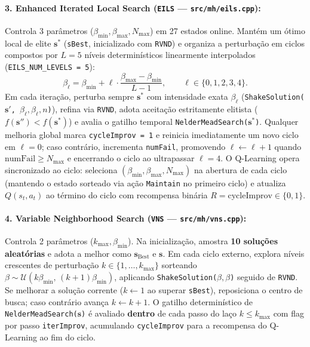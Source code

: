 \documentclass[11pt,a4paper]{article}
\begin{document}
\paragraph{3. Enhanced Iterated Local Search (\texttt{EILS} --- \texttt{src/mh/eils.cpp}):}
Controla 3 parâmetros ($\beta_{\min}, \beta_{\max}, N_{\max}$) em 27 estados online. Mantém um ótimo local de elite $\mathbf{s}^*$ (\texttt{sBest}, inicializado com \texttt{RVND}) e organiza a perturbação em ciclos compostos por $L = 5$ níveis determinísticos linearmente interpolados (\texttt{EILS\_NUM\_LEVELS = 5}):
\begin{equation}
  \beta_\ell = \beta_{\min} + \ell \cdot \frac{\beta_{\max} - \beta_{\min}}{L - 1},
  \qquad \ell \in \{0, 1, 2, 3, 4\}.
  \label{eq:eils_levels}
\end{equation}
Em cada iteração, perturba sempre $\mathbf{s}^*$ com intensidade exata $\beta_\ell$ (\texttt{ShakeSolution($\mathbf{s}'$, $\beta_\ell, \beta_\ell, n$)}), refina via \texttt{RVND}, adota aceitação estritamente elitista ($f(\mathbf{s}'') < f(\mathbf{s}^*)$) e avalia o gatilho temporal \texttt{NelderMeadSearch($\mathbf{s}^*$)}. Qualquer melhoria global marca \texttt{cycleImprov = 1} e reinicia imediatamente um novo ciclo em $\ell = 0$; caso contrário, incrementa \texttt{numFail}, promovendo $\ell \leftarrow \ell + 1$ quando $\text{numFail} \ge N_{\max}$ e encerrando o ciclo ao ultrapassar $\ell = 4$. O Q-Learning opera sincronizado ao ciclo: seleciona $(\beta_{\min}, \beta_{\max}, N_{\max})$ na abertura de cada ciclo (mantendo o estado sorteado via ação \texttt{Maintain} no primeiro ciclo) e atualiza $Q(s_t, a_t)$ ao término do ciclo com recompensa binária $R = \text{cycleImprov} \in \{0, 1\}$.

\paragraph{4. Variable Neighborhood Search (\texttt{VNS} --- \texttt{src/mh/vns.cpp}):}
Controla 2 parâmetros ($k_{\max}, \beta_{\min}$). Na inicialização, amostra \textbf{10 soluções aleatórias} e adota a melhor como $\mathbf{s}_{\text{Best}}$ e $\mathbf{s}$. Em cada ciclo externo, explora níveis crescentes de perturbação $k \in \{1, \dots, k_{\max}\}$ sorteando $\beta \sim \mathcal{U}(k\beta_{\min},\, (k+1)\beta_{\min})$, aplicando \texttt{ShakeSolution($\beta, \beta$)} seguido de \texttt{RVND}. Se melhorar a solução corrente ($k \leftarrow 1$ ao superar \texttt{sBest}), reposiciona o centro de busca; caso contrário avança $k \leftarrow k + 1$. O gatilho determinístico de \texttt{NelderMeadSearch($\mathbf{s}$)} é avaliado \textbf{dentro} de cada passo do laço $k \le k_{\max}$ com flag por passo \texttt{iterImprov}, acumulando \texttt{cycleImprov} para a recompensa do Q-Learning ao fim do ciclo.
\end{document}
